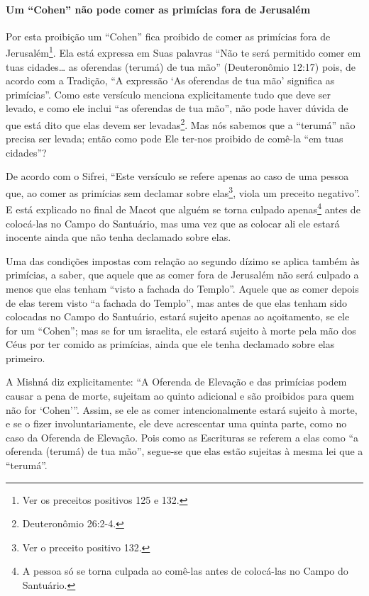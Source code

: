 \paragraph{Um ``Cohen'' não pode comer as primícias fora de Jerusalém}

Por esta proibição um ``Cohen'' fica proibido de comer as primícias fora
de Jerusalém\footnote{Ver os preceitos positivos 125 e 132.}. Ela está expressa em Suas palavras
``Não te será permitido comer em tuas cidades\ldots{} as oferendas (terumá)
de tua mão'' (Deuteronômio 12:17) pois, de acordo com a Tradição, ``A
expressão `As oferendas de tua mão' significa as primícias''. Como este
versículo menciona explicitamente tudo que deve ser levado, e como ele
inclui ``as oferendas de tua mão'', não pode haver dúvida de que está
dito que elas devem ser levadas\footnote{Deuteronômio 26:2-4.}. Mas nós sabemos
que a ``terumá'' não precisa ser levada; então como pode Ele ter-nos
proibido de comê-la ``em tuas cidades''?

De acordo com o Sifrei, ``Este versículo se refere apenas ao caso de uma
pessoa que, ao comer as primícias sem declamar sobre
elas\footnote{Ver o preceito positivo 132.}, viola um preceito negativo''. E está
explicado no final de Macot que alguém se torna culpado
apenas\footnote{A pessoa só se torna culpada ao comê-las antes de colocá-las no
Campo do Santuário.} antes de colocá-las no Campo do Santuário,
mas uma vez que as colocar ali ele estará inocente ainda que não tenha
declamado sobre elas.

Uma das condições impostas com relação ao segundo dízimo se aplica
também às primícias, a saber, que aquele que as comer fora de Jerusalém
não será culpado a menos que elas tenham ``visto a fachada do Templo''.
Aquele que as comer depois de elas terem visto ``a fachada do Templo'',
mas antes de que elas tenham sido colocadas no Campo do Santuário,
estará sujeito apenas ao açoitamento, se ele for um ``Cohen''; mas se
for um israelita, ele estará sujeito à morte pela mão dos Céus por ter
comido as primícias, ainda que ele tenha declamado sobre elas primeiro.

A Mishná diz explicitamente: ``A Oferenda de Elevação e das primícias
podem causar a pena de morte, sujeitam ao quinto adicional e são
proibidos para quem não for `Cohen'''. Assim, se ele as comer
intencionalmente estará sujeito à morte, e se o fizer
involuntariamente, ele deve acrescentar uma quinta parte, como no caso
da Oferenda de Elevação. Pois como as Escrituras se referem a elas como
``a oferenda (terumá) de tua mão'', segue-se que elas estão sujeitas à
mesma lei que a ``terumá''.


